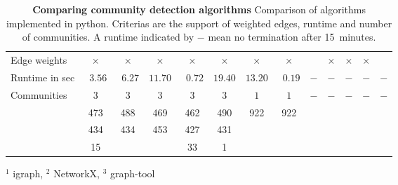 \newcommand{\mc}[2]{\multicolumn{#1}{c}{#2}}

\begin{table}[htbp]
\caption[Compairing community detection algorithms]{\textbf{Comparing community detection algorithms} Comparison of algorithms implemented in python. Criterias are the support of weighted edges, runtime and number of communities. A runtime indicated by $-$ mean no termination after 15~minutes.\\
}
\label{tab:algos}

\begin{tabular}{laacaaccccccc}
\toprule
	 {} &
	  &
	  &
	  &
	  &
	  &
	 
	  &
	  &
	 
	  &
	  &
	  &
	  &
	  \\ \midrule
	 
	 
	 
	 Edge weights & $\times$ & $\times$ & $\times$ & $\times$ & $\times$ & $\times$ & $\times$ & & $\times$ & $\times$ & $\times$ \\ \midrule
	 Runtime in sec & ~$3.56$ & ~$6.27$ & $11.70$ & ~$0.72$ & $19.40$ & $13.20$ & ~$0.19$ & $-$ & $-$ & $-$ & $-$ & $-$ \\ \midrule
	 Communities & $3$ & $3$ & $3$ & $3$ & $3$ & $1$ & $1$ & $-$ & $-$ & $-$ & $-$ & $-$ \\ \midrule
	  & 473 & 488 & 469 & 462 & 490 & 922 &  922 &  &  &  &  &  \\
	  & 434 & 434 & 453 & 427 & 431 &  &  &  &  &  &  &  \\
	  & 15 &  &  & 33 & 1 &  &  &  &  &  &  &  \\
	 \bottomrule
	 
\end{tabular}
\begin{flushright}
\footnotesize{
$^1$ igraph, $^2$ NetworkX, $^3$ graph-tool\\
}
\end{flushright}

\end{table}

